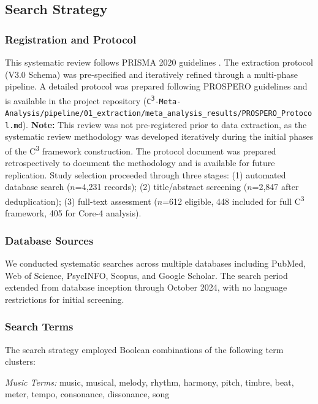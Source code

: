 \documentclass[9pt,onecolumn]{article}
\begin{document}
\subsection{Search Strategy}

\subsubsection{Registration and Protocol}

This systematic review follows PRISMA 2020 guidelines \citep{page2021prisma}. The extraction protocol (V3.0 Schema) was pre-specified and iteratively refined through a multi-phase pipeline. A detailed protocol was prepared following PROSPERO guidelines and is available in the project repository (\texttt{C\textsuperscript{3}-Meta-Analysis/pipeline/01\_extraction/meta\_analysis\_results/PROSPERO\_Protocol.md}). \textbf{Note:} This review was not pre-registered prior to data extraction, as the systematic review methodology was developed iteratively during the initial phases of the C\textsuperscript{3} framework construction. The protocol document was prepared retrospectively to document the methodology and is available for future replication. Study selection proceeded through three stages: (1) automated database search ($n$=4,231 records); (2) title/abstract screening ($n$=2,847 after deduplication); (3) full-text assessment ($n$=612 eligible, 448 included for full C\textsuperscript{3} framework, 405 for Core-4 analysis).

\subsubsection{Database Sources}

We conducted systematic searches across multiple databases including PubMed, Web of Science, PsycINFO, Scopus, and Google Scholar. The search period extended from database inception through October 2024, with no language restrictions for initial screening.

\subsubsection{Search Terms}

The search strategy employed Boolean combinations of the following term clusters:

\textit{Music Terms:} music, musical, melody, rhythm, harmony, pitch, timbre, beat, meter, tempo, consonance, dissonance, song
\end{document}
